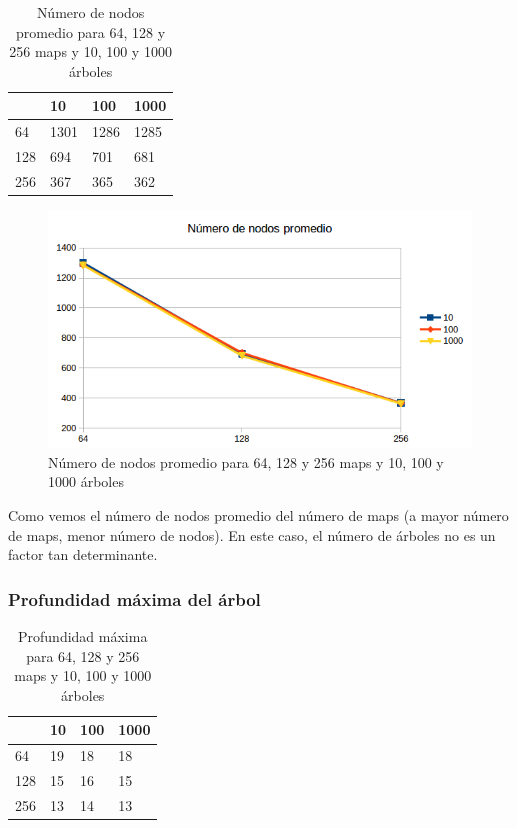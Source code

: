 \begin{table}[H]
	\centering
	\caption{Número de nodos promedio para 64, 128 y 256 maps y 10, 100 y 1000 árboles}
	\label{tab:nodos-promedio}
	\begin{tabular}{l|lll|}
		\cline{2-4}
		& 10    & 100    & 1000    \\ \hline
		\multicolumn{1}{|l|}{64}  & 1301 & 1286 & 1285 \\
		\multicolumn{1}{|l|}{128} & 694  & 701  & 681  \\
		\multicolumn{1}{|l|}{256} & 367  & 365  & 362  \\ \hline
	\end{tabular}
\end{table}

\begin{figure}[H]
	\centering
	\includegraphics[width=12cm]{img/nodos-promedio}
	\caption{Número de nodos promedio para 64, 128 y 256 maps y 10, 100 y 1000 árboles}
	\label{fig:nodos-promedio}
\end{figure}

Como vemos el número de nodos promedio del número de maps (a mayor número de maps, menor número de nodos). En este caso, el número de árboles no es un factor tan determinante.

\newpage
\subsubsection{Profundidad máxima del árbol}

\begin{table}[H]
	\centering
	\caption{Profundidad máxima para 64, 128 y 256 maps y 10, 100 y 1000 árboles}
	\label{tab:profundidad-maxima}
	\begin{tabular}{l|lll|}
		\cline{2-4}
		& 10    & 100    & 1000    \\ \hline
		\multicolumn{1}{|l|}{64}  & 19 & 18 & 18 \\
		\multicolumn{1}{|l|}{128} & 15 & 16 & 15 \\
		\multicolumn{1}{|l|}{256} & 13 & 14 & 13 \\ \hline
	\end{tabular}
\end{table}

